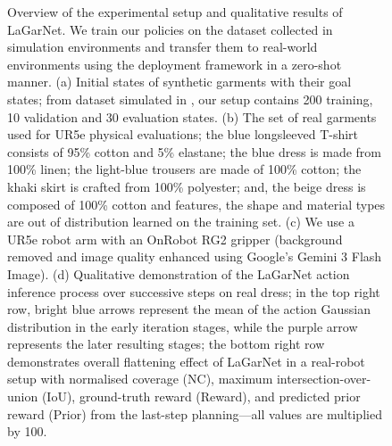 \documentclass[journal]{IEEEtran}
\begin{document}
\begin{figure}[t!]
    \caption{Overview of the experimental setup and qualitative results of LaGarNet. We train our  policies on the dataset collected in simulation environments \cite{canberk2023cloth} and transfer them to  real-world environments using the  deployment framework \cite{kadi2025draper} in a zero-shot manner. (a) Initial states of synthetic garments with their goal states; from  dataset \cite{bertiche2020cloth3d} simulated in  \cite{lin2020softgym}, our setup contains 200 training, 10 validation and 30 evaluation states. (b) The set of real garments used for UR5e physical evaluations; the blue longsleeved T-shirt consists of 95\% cotton and 5\% elastane; the blue dress is made from 100\% linen; the light-blue trousers are made of 100\% cotton; the khaki skirt is crafted from 100\% polyester; and, the beige dress is composed of 100\% cotton and features, the shape and material types are out of distribution learned on the training set. (c) We use a UR5e robot arm with an OnRobot RG2 gripper (background removed and image quality enhanced using Google's Gemini 3 Flash Image). (d) Qualitative demonstration of the LaGarNet action inference process over successive steps on real dress; in the top right row, bright blue arrows represent the mean of the action Gaussian distribution in the early iteration stages, while the purple arrow represents the later resulting stages; the bottom right row demonstrates overall flattening effect of LaGarNet in a real-robot setup with normalised coverage (NC), maximum intersection-over-union (IoU), ground-truth reward (Reward), and predicted prior reward (Prior) from the last-step planning---all values are multiplied by 100.}
    \label{fig:LaGarNet}
\end{figure}






\end{document}
